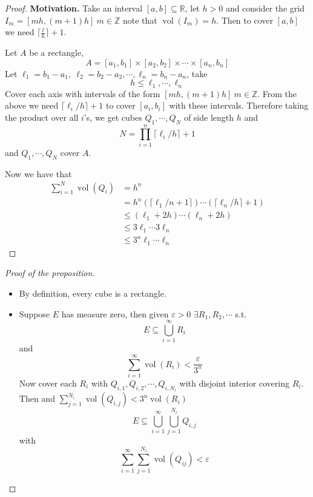 \documentclass[11pt,a4paper]{article}
\theoremstyle{definition}
\theoremstyle{plain}
\theoremstyle{remark}
\newcommand{\R}{\mathbb{R}}
\newcommand{\Z}{\mathbb{Z}}
\newcommand{\vol}{\operatorname{vol}}
\begin{document}
\begin{proof}
    \textbf{Motivation.} Take an interval $[a,b] \subseteq \R$, let $h > 0$ and consider the grid $I_m = [mh, (m+1)h] \ m \in \Z$ note that 
    $\vol (I_m) = h$. Then to cover $[a,b]$ we  need $\lceil \frac{l}{h} \rceil + 1$. 

    Let $A$ be a rectangle, 
    $$A = [a_1, b_1] \times [a_2, b_2] \times \cdots \times [a_n, b_n]$$
    Let $\ell_1 = b_1 - a_1 ,\ \ell_2 = b_2-a_2, \cdots, \ell_n = b_n - a_n$, take 
    $$h \le \ell_1, \cdots, \ell_n$$
    Cover each axis with intervals of the form $[mh, (m+1)h]\ m \in \Z$. From the above we need $\lceil \ell_i/h\rceil + 1$ 
    to cover $[a_i, b_i]$ with these intervals. Therefore taking the product over all $i$'s, we get cubes $Q_1, \cdots, Q_N$ of 
    side length $h$ and 
    $$N = \prod_{i=1}^n \lceil \ell_i/h\rceil + 1$$
    and $Q_1, \cdots, Q_N$ cover $A$.

    Now we have that 
    \begin{align*}
        \sum_{i=1}^N \vol (Q_i) &= h^n \\
        &= h^n \left(\lceil \ell_1/n + 1\rceil\right) \cdots \left(\lceil \ell_n/h\rceil + 1\right) \\
        &\le (\ell_1 + 2h) \cdots (\ell_n + 2h) \\
        &\le 3 \ell_1 \cdots 3 \ell_n \\
        &\le 3^n \ell_1 \cdots \ell_n
    \end{align*}
\end{proof}

\begin{proof}[Proof of the proposition]
    \begin{itemize}
        \item[$\impliedby$] By definition, every cube is a rectangle. 
        
        \item[$\implies$] Suppose $E$ has measure zero, then given $\varepsilon > 0$ $\exists R_1, R_2, \cdots$ s.t. 
        $$E \subseteq \bigcup_{i=1}^\infty R_i$$ 
        and 
        $$\sum_{i=1}^\infty \vol (R_i) < \frac{\varepsilon}{3^n}$$
        Now cover each $R_i$ with $Q_{i,1}, Q_{i,2}, \cdots, Q_{i,N_i}$ with disjoint interior covering $R_i$. Then 
        and $\sum_{j=1}^{N_i} \vol (Q_{i,j}) < 3^n \vol (R_i)$
        $$E \subseteq \bigcup_{i=1}^\infty \bigcup_{j=1}^{N_i}  Q_{i,j}$$
        with 
        $$\sum_{i=1}^\infty \sum_{j=1}^{N_i} \vol (Q_{ij}) < \varepsilon$$
    \end{itemize}
\end{proof}
\end{document}
